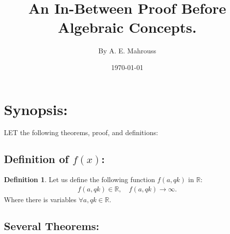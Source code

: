 \documentclass[10pt]{article}
\title{%
	\vspace{-1.5em}%
	\large\textbf{An In-Between Proof Before Algebraic Concepts.}%
}
\author{By A. E. Mahrouss}
\date{\today}
\theoremstyle{plain}
\theoremstyle{definition}
\newtheorem{definition}[theorem]{Definition}
\theoremstyle{remark}
\begin{document}

\maketitle
\tableofcontents
\newpage

\section{Synopsis:}

\lettrine[lines=1, lhang=0.1, loversize=0.2]{L}ET the following theorems, proof, and definitions:

\subsection{Definition of $f(x)$:}

\begin{definition}
	Let us define the following function $f(a, qk)$ in $\mathbb{R}$:
	\begin{align*}
		f(a, qk) \in \mathbb{R}, \quad f(a, qk) \to \infty.
	\end{align*}
	Where there is variables $\forall a, qk \in \mathbb{R}$.
\end{definition}

\subsection{Several Theorems:}
\end{document}
